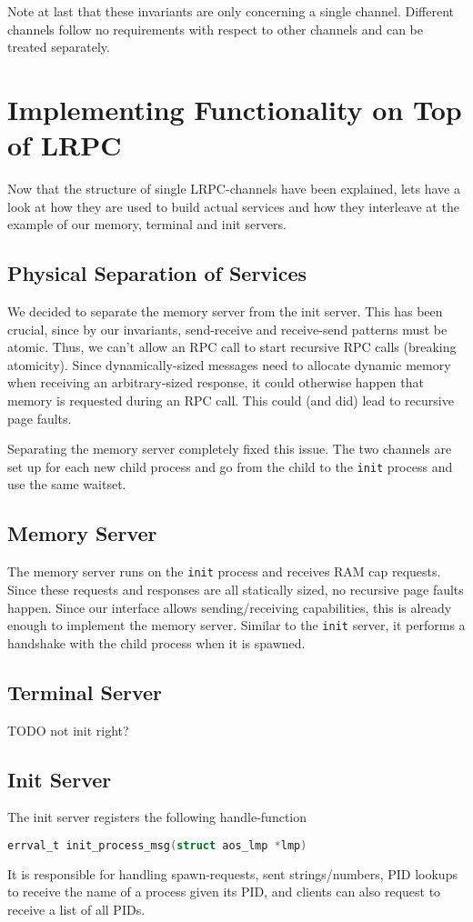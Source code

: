 Note at last that these invariants are only concerning a single channel.
Different channels follow no requirements with respect to other channels 
and can be treated separately.

\section{Implementing Functionality on Top of LRPC}
Now that the structure of single LRPC-channels have been explained, 
lets have a look at how they are used to build actual services and how 
they interleave at the example of our memory, terminal and init servers.

\subsection{Physical Separation of Services}
We decided to separate the memory server from the init server.
This has been crucial, since by our invariants, send-receive and receive-send 
patterns must be atomic. Thus, we can't allow an RPC call to 
start recursive RPC calls (breaking atomicity). Since dynamically-sized messages 
need to allocate dynamic memory when receiving an arbitrary-sized response, 
it could otherwise happen that memory is requested during an RPC call.
This could (and did) lead to recursive page faults.

Separating the memory server completely fixed this issue.
The two channels are set up for each new child process and go from the child to the 
\texttt{init} process and use the same waitset.

\subsection{Memory Server}
The memory server runs on the \texttt{init} process and receives RAM cap requests.
Since these requests and responses are all statically sized, no recursive page faults 
happen. Since our interface allows sending/receiving capabilities, this 
is already enough to implement the memory server.
Similar to the \texttt{init} server, it performs a handshake with the child process
when it is spawned. 
\subsection{Terminal Server}
TODO not init right?
\subsection{Init Server}
The init server registers the following handle-function 
\begin{lstlisting}[language=C]
    errval_t init_process_msg(struct aos_lmp *lmp)
\end{lstlisting}
It is responsible for handling spawn-requests, sent strings/numbers, PID lookups to receive 
the name of a process given its PID, and clients can also request to receive a list of all PIDs.

